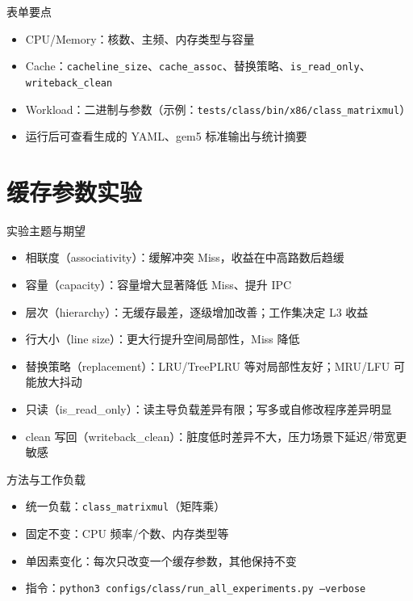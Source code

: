 \documentclass[aspectratio=169]{beamer}
\begin{document}
\begin{frame}{表单要点}
  \begin{itemize}
    \item CPU/Memory：核数、主频、内存类型与容量
    \item Cache：\texttt{cacheline\_size}、\texttt{cache\_assoc}、替换策略、\texttt{is\_read\_only}、\texttt{writeback\_clean}
    \item Workload：二进制与参数（示例：\texttt{tests/class/bin/x86/class\_matrixmul}）
    \item 运行后可查看生成的 YAML、gem5 标准输出与统计摘要
  \end{itemize}
\end{frame}

\section{缓存参数实验}

\begin{frame}{实验主题与期望}
  \begin{itemize}
    \item 相联度（associativity）：缓解冲突 Miss，收益在中高路数后趋缓
    \item 容量（capacity）：容量增大显著降低 Miss、提升 IPC
    \item 层次（hierarchy）：无缓存最差，逐级增加改善；工作集决定 L3 收益
    \item 行大小（line size）：更大行提升空间局部性，Miss 降低
    \item 替换策略（replacement）：LRU/TreePLRU 等对局部性友好；MRU/LFU 可能放大抖动
    \item 只读（is\_read\_only）：读主导负载差异有限；写多或自修改程序差异明显
    \item clean 写回（writeback\_clean）：脏度低时差异不大，压力场景下延迟/带宽更敏感
  \end{itemize}
\end{frame}

\begin{frame}{方法与工作负载}
  \begin{itemize}
    \item 统一负载：\texttt{class\_matrixmul}（矩阵乘）
    \item 固定不变：CPU 频率/个数、内存类型等
    \item 单因素变化：每次只改变一个缓存参数，其他保持不变
    \item 指令：\texttt{python3 configs/class/run\_all\_experiments.py --verbose}
  \end{itemize}
\end{frame}
\end{document}
